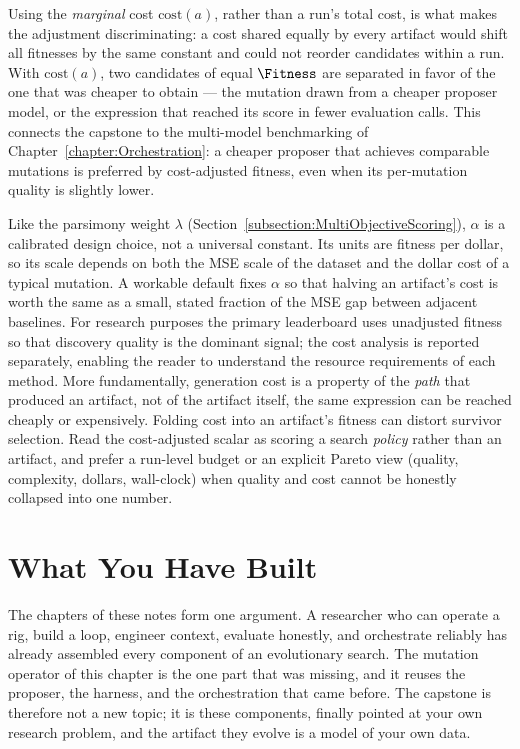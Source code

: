 Using the \emph{marginal} cost $\mathrm{cost}(a)$, rather than a run's total cost, is what makes the adjustment discriminating: a cost shared equally by every artifact would shift all fitnesses by the same constant and could not reorder candidates within a run.
With $\mathrm{cost}(a)$, two candidates of equal $\Fitness$ are separated in favor of the one that was cheaper to obtain — the mutation drawn from a cheaper proposer model, or the expression that reached its score in fewer evaluation calls.
This connects the capstone to the multi-model benchmarking of Chapter~\ref{chapter:Orchestration}: a cheaper proposer that achieves comparable mutations is preferred by cost-adjusted fitness, even when its per-mutation quality is slightly lower.

\begin{remark}
Like the parsimony weight $\lambda$ (Section~\ref{subsection:MultiObjectiveScoring}), $\alpha$ is a calibrated design choice, not a universal constant.
Its units are fitness per dollar, so its scale depends on both the MSE scale of the dataset and the dollar cost of a typical mutation.
A workable default fixes $\alpha$ so that halving an artifact's cost is worth the same as a small, stated fraction of the MSE gap between adjacent baselines.
For research purposes the primary leaderboard uses unadjusted fitness so that discovery quality is the dominant signal; the cost analysis is reported separately, enabling the reader to understand the resource requirements of each method.
More fundamentally, generation cost is a property of the \emph{path} that produced an artifact, not of the artifact itself, the same expression can be reached cheaply or expensively.
Folding cost into an artifact's fitness can distort survivor selection.
Read the cost-adjusted scalar as scoring a search \emph{policy} rather than an artifact, and prefer a run-level budget or an explicit Pareto view (quality, complexity, dollars, wall-clock) when quality and cost cannot be honestly collapsed into one number.
\end{remark}

\section{What You Have Built}
\label{section:WhatYouHaveBuilt}

The chapters of these notes form one argument.
A researcher who can operate a rig, build a loop, engineer context, evaluate honestly, and orchestrate reliably has already assembled every component of an evolutionary search.
The mutation operator of this chapter is the one part that was missing, and it reuses the proposer, the harness, and the orchestration that came before.
The capstone is therefore not a new topic; it is these components, finally pointed at your own research problem, and the artifact they evolve is a model of your own data.

